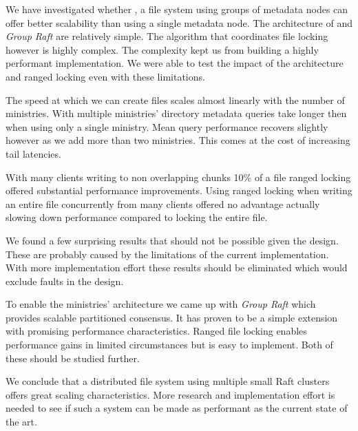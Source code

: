 We have investigated whether \name{}, a file system using groups of metadata nodes can offer better scalability than using a single metadata node. The architecture of \name{} and \textit{Group Raft} are relatively simple. The algorithm that coordinates file locking however is highly complex. The complexity kept us from building a highly performant implementation. We were able to test the impact of the architecture and ranged locking even with these limitations.

The speed at which we can create files scales almost linearly with the number of ministries. With multiple ministries' directory metadata queries take longer then when using only a single ministry. Mean query performance recovers slightly however as we add more than two ministries. This comes at the cost of increasing tail latencies.

With many clients writing to non overlapping chunks 10\% of a file ranged locking offered substantial performance improvements. Using ranged locking when writing an entire file concurrently from many clients offered no advantage actually slowing down performance compared to locking the entire file.

We found a few surprising results that should not be possible given the design. These are probably caused by the limitations of the current implementation. With more implementation effort these results should be eliminated which would exclude faults in the design.

To enable the ministries' architecture we came up with \textit{Group Raft} which provides scalable partitioned consensus. It has proven to be a simple extension with promising performance characteristics. Ranged file locking enables performance gains in limited circumstances but is easy to implement. Both of these should be studied further. 

We conclude that a distributed file system using multiple small Raft clusters offers great scaling characteristics. More research and implementation effort is needed to see if such a system can be made as performant as the current state of the art.
